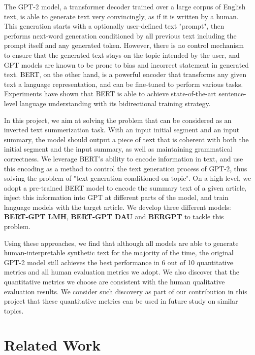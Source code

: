 \documentclass{article}
\begin{document}
The GPT-2 model, a transformer decoder trained over a large corpus of English text, is able to generate text very convincingly, as if it is written by a human. This generation starts with a optionally user-defined text "prompt", then performs next-word generation conditioned by all previous text including the prompt itself and any generated token. However, there is no control mechanism to ensure that the generated text stays on the topic intended by the user, and GPT models are known to be prone to bias and incorrect statement in generated text\cite{github}. BERT, on the other hand, is a powerful encoder that transforms any given text a language representation, and can be fine-tuned to perform various tasks. Experiments have shown that BERT is able to achieve state-of-the-art sentence-level language understanding with its bidirectional training strategy\cite{bert}.

In this project, we aim at solving the problem that can be considered as an inverted text summerization task. With an input initial segment and an input summary, the model should output a piece of text that is coherent with both the initial segment and the input summary, as well as maintaining grammatical correctness. We leverage BERT's ability to encode information in text, and use this encoding as a method to control the text generation process of GPT-2, thus solving the problem of "text generation conditioned on topic". On a high level, we adopt a pre-trained BERT model to encode the summary text of a given article, inject this information into GPT at different parts of the model, and train language models with the target article. We develop three different models: \textbf{BERT-GPT LMH}, \textbf{BERT-GPT DAU} and \textbf{BERGPT} to tackle this problem.

Using these approaches, we find that although all models are able to generate human-interpretable synthetic text for the majority of the time, the original GPT-2 model still achieves the best performance in 6 out of 10 quantitative metrics and all human evaluation metrics we adopt. We also discover that the quantitative metrics we choose are consistent with the human qualitative evaluation results. We consider such discovery as part of our contribution in this project that these quantitative metrics can be used in future study on similar topics.




\section{Related Work}
\end{document}
